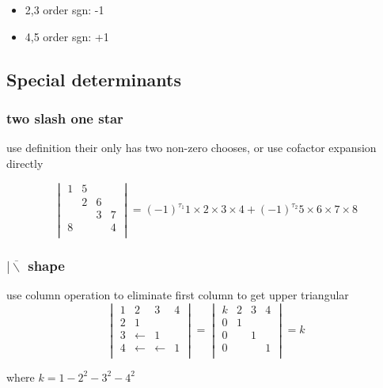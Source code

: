 \documentclass{overview}
\begin{document}
\begin{itemize}
 \item 2,3 order sgn: -1
 \item 4,5 order sgn: +1
\end{itemize}

\subsection{Special determinants}

\subsubsection{ two slash one star}

use definition their only has two non-zero chooses, or use cofactor expansion directly

\[
	\begin{vmatrix}
		1 & 5 &   &   \\
      & 2 & 6 &   \\
      &   & 3 & 7 \\
		8 &   &   & 4 \\
	\end{vmatrix}
	= (-1)^{\tau_1} 1\times2\times3\times4 + (-1)^{\tau_2} 5\times6\times7\times8
\] 

\subsubsection{$|\overline\backslash$ shape}

use column operation to eliminate first column to get upper triangular
\[
\begin{vmatrix}
	1 & 2          & 3          & 4 \\
	2 & 1          &            &   \\
	3 & \leftarrow & 1          &   \\
	4 & \leftarrow & \leftarrow & 1 \\
\end{vmatrix}
=
\begin{vmatrix}
	k  & 2 & 3 & 4 \\
	 0 & 1 &   &   \\
	0  &   & 1 &   \\
	0  &   &   & 1 \\
\end{vmatrix} = k
\] 

where $k=1-2^2-3^2-4^2$
\end{document}
